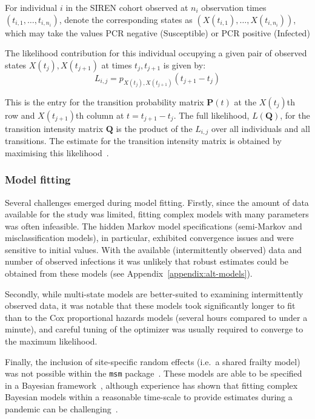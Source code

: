 For individual $i$ in the SIREN cohort observed at $n_i$ observation times $(t_{i,1}, \dots , t_{i,n_i})$, denote the corresponding states as $\left(X(t_{i,1}),\ldots, X(t_{i,n_i})\right)$, which may take the values PCR negative (Susceptible) or PCR positive (Infected)

The likelihood contribution for this individual occupying a given pair of observed states $X(t_j), X(t_{j+1})$ at times $t_j, t_{j+1}$ is given by:
%
\[
    L_{i,j} = p_{X(t_j), X(t_{j+1})}(t_{j+1} - t_j)
\]

This is the entry for the transition probability matrix $\mathbf{P}(t)$ at the $X(t_j)$th row and $X(t_{j+1})$th column at $t = t_{j+1} - t_j$. The full likelihood, $L(\mathbf{Q})$, for the transition intensity matrix $\mathbf{Q}$ is the product of the $L_{i,j}$ over all individuals and all transitions. The estimate for the transition intensity matrix is obtained by maximising this likelihood~\parencite{Jackson2011-ry}.

\subsubsection{Model fitting}

Several challenges emerged during model fitting. Firstly, since the amount of data available for the study was limited, fitting complex models with many parameters was often infeasible. The hidden Markov model specifications (semi-Markov and misclassification models), in particular, exhibited convergence issues and were sensitive to initial values. With the available (intermittently observed) data and number of observed infections it was unlikely that robust estimates could be obtained from these models (see Appendix~\ref{appendix:alt-models}).

Secondly, while multi-state models are better-suited to examining intermittently observed data, it was notable that these models took significantly longer to fit than to the Cox proportional hazards models (several hours compared to under a minute), and careful tuning of the optimizer was usually required to converge to the maximum likelihood.

Finally, the inclusion of site-specific random effects (i.e.\ a shared frailty model) was not possible within the \texttt{msm} package~\parencite{Jackson2021-ij}. These models are able to be specified in a Bayesian framework~\parencite{van-den-Hout2016-xy}, although experience has shown that fitting complex Bayesian models within a reasonable time-scale to provide estimates during a pandemic can be challenging~\parencite{Birrell2021-ou}.

